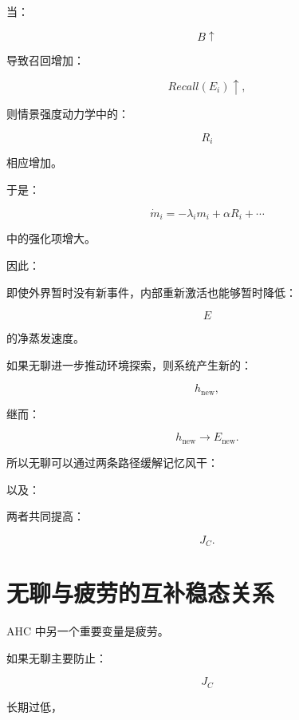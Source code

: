 当：

\[
B\uparrow
\]

导致召回增加：

\[
Recall(E_i)\uparrow,
\]

则情景强度动力学中的：

\[
R_i
\]

相应增加。

于是：

\[
\dot m_i
=
-\lambda_i m_i
+
\alpha R_i+\cdots
\]

中的强化项增大。

因此：

\begin{statementbox}
\centering
{}
\end{statementbox}

即使外界暂时没有新事件，内部重新激活也能够暂时降低：

\[
E
\]

的净蒸发速度。

如果无聊进一步推动环境探索，则系统产生新的：

\[
h_{\mathrm{new}},
\]

继而：

\[
h_{\mathrm{new}}
\rightarrow
E_{\mathrm{new}}.
\]

所以无聊可以通过两条路径缓解记忆风干：

\begin{statementbox}
\centering
{}
\end{statementbox}

以及：

\begin{statementbox}
\centering
{}
\end{statementbox}

两者共同提高：

\[
J_C.
\]

\section{无聊与疲劳的互补稳态关系}

AHC 中另一个重要变量是疲劳。

如果无聊主要防止：

\[
J_C
\]

长期过低，

